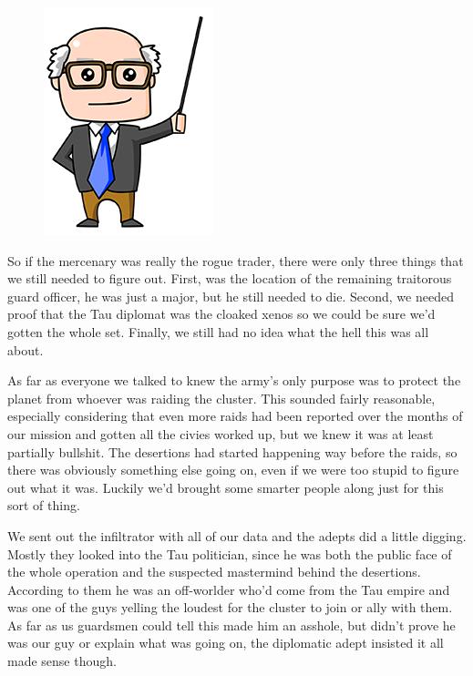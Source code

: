 \begin{figure}
	\begin{center}
		\includegraphics[width=\figwidth]{pics/10/47.png}
	\end{center}
\end{figure}
So if the mercenary was really the rogue trader, there were only three things that we still needed to figure out. 
First, was the location of the remaining traitorous guard officer, he was just a major, but he still needed to die. 
Second, we needed proof that the Tau diplomat was the cloaked xenos so we could be sure we'd gotten the whole set. 
Finally, we still had no idea what the hell this was all about. 


As far as everyone we talked to knew the army's only purpose was to protect the planet from whoever was raiding the cluster. 
This sounded fairly reasonable, especially considering that even more raids had been reported over the months of our mission and gotten all the civies worked up, but we knew it was at least partially bullshit. 
The desertions had started happening way before the raids, so there was obviously something else going on, even if we were too stupid to figure out what it was. 
Luckily we'd brought some smarter people along just for this sort of thing.

We sent out the infiltrator with all of our data and the adepts did a little digging. 
Mostly they looked into the Tau politician, since he was both the public face of the whole operation and the suspected mastermind behind the desertions. 
According to them he was an off-worlder who'd come from the Tau empire and was one of the guys yelling the loudest for the cluster to join or ally with them. 
As far as us guardsmen could tell this made him an asshole, but didn't prove he was our guy or explain what was going on, the diplomatic adept insisted it all made sense though. 


